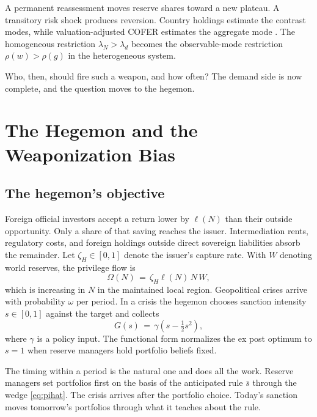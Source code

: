 \documentclass[11pt]{article}
\theoremstyle{definition}
\begin{document}
A permanent reassessment moves reserve shares toward a new plateau. A transitory risk shock produces reversion. Country holdings estimate the contrast modes, while valuation-adjusted COFER estimates the aggregate mode \citep{ArslanalpEichengreenSimpsonBell2022}. The homogeneous restriction $\lambda_N>\lambda_d$ becomes the observable-mode restriction $\rho(w)>\rho(g)$ in the heterogeneous system.

Who, then, should fire such a weapon, and how often? The demand side is now complete, and the question moves to the hegemon.

\section{The Hegemon and the Weaponization Bias}\label{sec:hegemon}

\subsection{The hegemon's objective}

Foreign official investors accept a return lower by $\ell(N)$ than their outside opportunity. Only a share of that saving reaches the issuer. Intermediation rents, regulatory costs, and foreign holdings outside direct sovereign liabilities absorb the remainder. Let $\zeta_H\in[0,1]$ denote the issuer's capture rate. With $W$ denoting world reserves, the privilege flow is
\begin{equation}
\Omega(N) \,=\, \zeta_H\ell(N)\,N\,W,
\label{eq:privilege}
\end{equation}
which is increasing in $N$ in the maintained local region. Geopolitical crises arrive with probability $\omega$ per period. In a crisis the hegemon chooses sanction intensity $s \in [0,1]$ against the target and collects
\begin{equation}
G(s) \,=\, \gamma\left(s - \tfrac{1}{2}s^2\right),
\label{eq:G}
\end{equation}
where $\gamma$ is a policy input. The functional form normalizes the ex post optimum to $s=1$ when reserve managers hold portfolio beliefs fixed.

The timing within a period is the natural one and does all the work. Reserve managers set portfolios first on the basis of the anticipated rule $\bar s$ through the wedge \eqref{eq:pihat}. The crisis arrives after the portfolio choice. Today's sanction moves tomorrow's portfolios through what it teaches about the rule.
\end{document}
